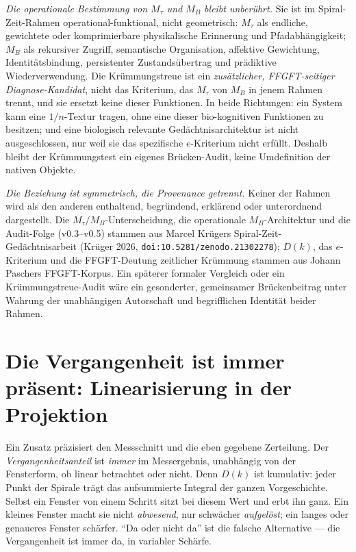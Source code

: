 \emph{Die operationale Bestimmung von $M_\tau$ und $M_B$ bleibt unberührt.} Sie ist im
Spiral-Zeit-Rahmen operational-funktional, nicht geometrisch: $M_\tau$ als endliche, gewichtete
oder komprimierbare physikalische Erinnerung und Pfadabhängigkeit; $M_B$ als rekursiver
Zugriff, semantische Organisation, affektive Gewichtung, Identitätsbindung, persistenter
Zustandsübertrag und prädiktive Wiederverwendung. Die Krümmungstreue ist ein \emph{zusätzlicher,
FFGFT-seitiger Diagnose-Kandidat}, nicht das Kriterium, das $M_\tau$ von $M_B$ in jenem Rahmen
trennt, und sie ersetzt keine dieser Funktionen. In beide Richtungen: ein System kann eine
$1/n$-Textur tragen, ohne eine dieser bio-kognitiven Funktionen zu besitzen; und eine
biologisch relevante Gedächtnisarchitektur ist nicht ausgeschlossen, nur weil sie das
spezifische $e$-Kriterium nicht erfüllt. Deshalb bleibt der Krümmungstest ein eigenes
Brücken-Audit, keine Umdefinition der nativen Objekte.

\emph{Die Beziehung ist symmetrisch, die Provenance getrennt.} Keiner der Rahmen wird als den
anderen enthaltend, begründend, erklärend oder unterordnend dargestellt. Die
$M_\tau/M_B$-Unterscheidung, die operationale $M_B$-Architektur und die Audit-Folge
(v0.3--v0.5) stammen aus Marcel Krügers Spiral-Zeit-Gedächtnisarbeit (Krüger 2026, \texttt{doi:10.5281/zenodo.21302278}); $D(k)$, das
$e$-Kriterium und die FFGFT-Deutung zeitlicher Krümmung stammen aus Johann Paschers
FFGFT-Korpus. Ein späterer formaler Vergleich oder ein Krümmungstreue-Audit wäre ein
gesonderter, gemeinsamer Brückenbeitrag unter Wahrung der unabhängigen Autorschaft und
begrifflichen Identität beider Rahmen.

\section{Die Vergangenheit ist immer präsent: Linearisierung in der Projektion}

Ein Zusatz präzisiert den Messschnitt und die eben gegebene Zerteilung. Der
\emph{Vergangenheitsanteil} ist \emph{immer} im Messergebnis, unabhängig von der Fensterform,
ob linear betrachtet oder nicht. Denn $D(k)$ ist kumulativ: jeder Punkt der Spirale trägt das
aufsummierte Integral der ganzen Vorgeschichte. Selbst ein Fenster von einem Schritt sitzt
bei diesem Wert und erbt ihn ganz. Ein kleines Fenster macht sie nicht
\emph{abwesend}, nur schwächer \emph{aufgelöst}; ein langes oder genaueres Fenster schärfer.
\enquote{Da oder nicht da} ist die falsche Alternative --- die Vergangenheit ist immer da, in
variabler Schärfe.

